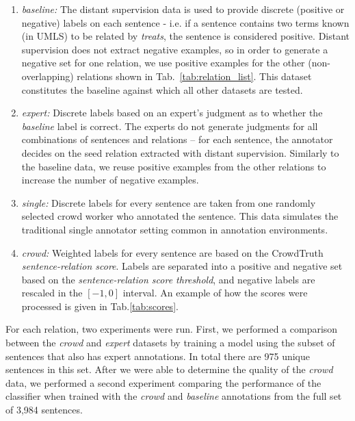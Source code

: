 \begin{enumerate}

\item \textit{baseline:} The distant supervision data is used to provide discrete (positive or negative) labels on each sentence - i.e. if a sentence contains two terms known (in UMLS) to be related by \textit{treats}, the sentence is considered positive. Distant supervision does not extract negative examples, so in order to generate a negative set for one relation, we use positive examples for the other (non-overlapping) relations shown in Tab.~\ref{tab:relation_list}. This dataset constitutes the baseline against which all other datasets are tested.

\item \textit{expert:} Discrete labels based on an expert's judgment as to whether the \textit{baseline} label is correct. The experts do not generate judgments for all combinations of sentences and relations -- for each sentence, the annotator decides on the seed relation extracted with distant supervision.  Similarly to the baseline data, we reuse positive examples from the other relations to increase the number of negative examples.

\item \textit{single:} Discrete labels for every sentence are taken from one randomly selected crowd worker who annotated the sentence.  This data simulates the traditional single annotator setting common in annotation environments.

\item \textit{crowd:} Weighted labels for every sentence are based on the CrowdTruth \textit{sentence-relation score}.  Labels are separated into a positive and negative set based on the \textit{sentence-relation score threshold}, and negative labels are rescaled in the $[-1, 0]$ interval. An example of how the scores were processed is given in Tab.\ref{tab:scores}.

\end{enumerate}

For each relation, two experiments were run. First, we performed a comparison between the \textit{crowd} and \textit{expert} datasets by training a model using the subset of sentences that also has expert annotations. In total there are 975 unique sentences in this set. After we were able to determine the quality of the \textit{crowd} data, we performed a second experiment comparing the performance of the classifier when trained with the \textit{crowd} and \textit{baseline} annotations from the full set of 3,984 sentences.


